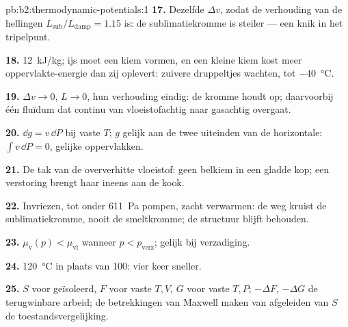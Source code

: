 \begin{solution}{pb:b2:thermodynamic-potentials:1}
\textbf{17.} Dezelfde $\Delta v$, zodat de verhouding van de hellingen
$L_{\text{sub}}/L_{\text{damp}}
= 1.15$ is: de sublimatiekromme is steiler
--- een knik in het tripelpunt.

\textbf{18.} \qty{12}{kJ/kg}; ijs moet een kiem vormen, en een kleine kiem kost
meer oppervlakte-energie dan zij oplevert: zuivere druppeltjes wachten, tot
\qty{-40}{\celsius}.

\textbf{19.} $\Delta v \to 0$, $L \to 0$, hun verhouding eindig: de kromme houdt op;
daarvoorbij één fluïdum dat continu van vloeistofachtig naar gasachtig overgaat.

\textbf{20.} $\dd g = v\,\dd P$ bij vaste $T$; $g$ gelijk aan de twee uiteinden van
de horizontale: $\int v\,\dd P = 0$, gelijke oppervlakken.

\textbf{21.} De tak van de oververhitte vloeistof: geen belkiem in een
gladde kop; een verstoring brengt haar ineens aan de kook.

\textbf{22.} Invriezen, tot onder \qty{611}{Pa} pompen, zacht verwarmen: de weg
kruist de sublimatiekromme, nooit de smeltkromme; de structuur
blijft behouden.

\textbf{23.} $\mu_{\text{v}}(p) < \mu_{\text{vl}}$ wanneer
$p < p_{\text{verz}}$; gelijk bij
verzadiging.

\textbf{24.} \qty{120}{\celsius} in plaats van \qty{100}{}: vier keer sneller.

\textbf{25.} $S$ voor geïsoleerd, $F$ voor vaste $T,V$, $G$ voor vaste $T,P$;
$-\Delta F$, $-\Delta G$ de terugwinbare arbeid; de betrekkingen van Maxwell
maken van
afgeleiden van $S$ de toestandsvergelijking.
\end{solution}
